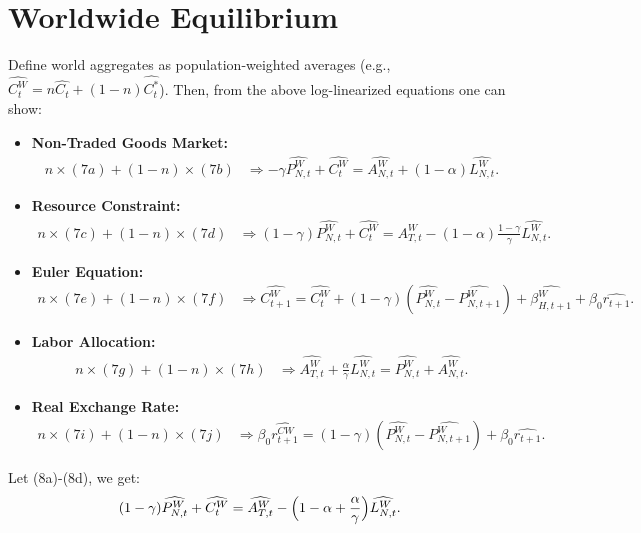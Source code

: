 \documentclass[a4paper,12pt]{article} %
\theoremstyle{nonitalic}
\begin{document}
\section{Worldwide Equilibrium}

Define world aggregates as population-weighted averages (e.g., $  \widehat{C_t^W} = n \widehat{C_t} + (1-n) \widehat{C_t^*}$).
Then, from the above log-linearized equations one can show:
\begin{itemize}
    \item \textbf{Non-Traded Goods Market:}
    \begin{align*}
        n \times (7a) + (1-n) \times (7b) &\Rightarrow -\gamma  \widehat{P_{N,t}^W} +  \widehat{C_t^W} =  \widehat{A_{N,t}^W} + (1-\alpha)  \widehat{L_{N,t}^W} \tag{8a}.
    \end{align*}
    \item \textbf{Resource Constraint:}
    \begin{align*}
        n \times (7c) + (1-n) \times (7d) &\Rightarrow (1-\gamma)  \widehat{P_{N,t}^W} +  \widehat{C_t^W} =  \widehat{A_{T,t}^W} - (1-\alpha) \frac{1-\gamma}{\gamma}  \widehat{L_{N,t}^W} \tag{8b}.
    \end{align*}
    \item \textbf{Euler Equation:}
    \begin{align*}
        n \times (7e) + (1-n) \times (7f) &\Rightarrow  \widehat{C_{t+1}^W} =  \widehat{C_t^W} + (1-\gamma) ( \widehat{P_{N,t}^W} -  \widehat{P_{N,t+1}^W}) +  \widehat{\beta_{H,t+1}^W} + \beta_0 \widehat{r_{t+1}} \tag{8c}.
    \end{align*}
    \item \textbf{Labor Allocation:}
    \begin{align*}
        n \times (7g) + (1-n) \times (7h) &\Rightarrow  \widehat{A_{T,t}^W} + \frac{\alpha}{\gamma}  \widehat{L_{N,t}^W} =  \widehat{P_{N,t}^W} +  \widehat{A_{N,t}^W} \tag{8d}.
    \end{align*}
    \item \textbf{Real Exchange Rate:}
    \begin{align*}
        n \times (7i) + (1-n) \times (7j) &\Rightarrow \beta_0  \widehat{r_{t+1}^{C W}} = (1-\gamma) ( \widehat{P_{N,t}^W} -  \widehat{P_{N,t+1}^W}) + \beta_0  \widehat{r_{t+1}} \tag{8e}.
    \end{align*}
\end{itemize}
Let (8a)-(8d), we get:
\[
(1-\gamma)  \widehat{P_{N,t}^W} +  \widehat{C_t^W} =  \widehat{A_{T,t}^W} - \Bigl(1-\alpha + \frac{\alpha}{\gamma} \Bigr)  \widehat{L_{N,t}^W}.
\]
\end{document}
